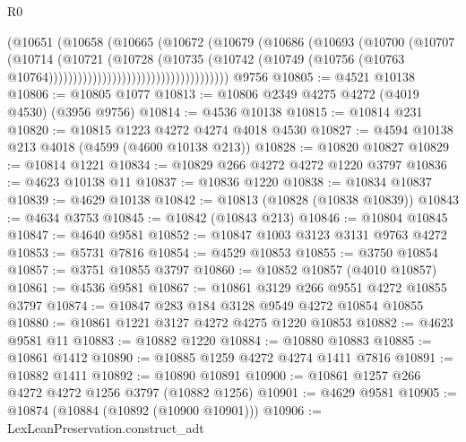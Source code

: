 \begin{lexlean}{R0}
\begin{coremodule}
                                            (@10651
                                              (@10658
                                                (@10665
                                                  (@10672
                                                    (@10679
                                                      (@10686
                                                        (@10693
                                                          (@10700
                                                            (@10707
                                                              (@10714
                                                                (@10721
                                                                  (@10728
                                                                    (@10735
                                                                      (@10742
                                                                        (@10749
                                                                          (@10756
                                                                            (@10763
                                                                              @10764)))))))))))))))))))))))))))))))))))))
    @9756
@10805 := @4521 @10138
@10806 := @10805 @1077
@10813 := @10806 @2349 @4275 @4272 (@4019 @4530) (@3956 @9756)
@10814 := @4536 @10138
@10815 := @10814 @231
@10820 := @10815 @1223 @4272 @4274 @4018 @4530
@10827 := @4594 @10138 @213 @4018 (@4599 (@4600 @10138 @213))
@10828 := @10820 @10827
@10829 := @10814 @1221
@10834 := @10829 @266 @4272 @4272 @1220 @3797
@10836 := @4623 @10138 @11
@10837 := @10836 @1220
@10838 := @10834 @10837
@10839 := @4629 @10138
@10842 := @10813 (@10828 (@10838 @10839))
@10843 := @4634 @3753
@10845 := @10842 (@10843 @213)
@10846 := @10804 @10845
@10847 := @4640 @9581
@10852 := @10847 @1003 @3123 @3131 @9763 @4272
@10853 := @5731 @7816
@10854 := @4529 @10853
@10855 := @3750 @10854
@10857 := @3751 @10855 @3797
@10860 := @10852 @10857 (@4010 @10857)
@10861 := @4536 @9581
@10867 := @10861 @3129 @266 @9551 @4272 @10855 @3797
@10874 := @10847 @283 @184 @3128 @9549 @4272 @10854 @10855
@10880 := @10861 @1221 @3127 @4272 @4275 @1220 @10853
@10882 := @4623 @9581 @11
@10883 := @10882 @1220
@10884 := @10880 @10883
@10885 := @10861 @1412
@10890 := @10885 @1259 @4272 @4274 @1411 @7816
@10891 := @10882 @1411
@10892 := @10890 @10891
@10900 := @10861 @1257 @266 @4272 @4272 @1256 @3797 (@10882 @1256)
@10901 := @4629 @9581
@10905 := @10874 (@10884 (@10892 (@10900 @10901)))
@10906 := LexLeanPreservation.construct_adt

\end{coremodule}
\end{lexlean}
